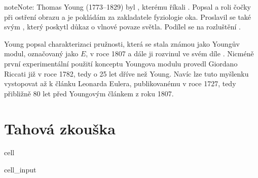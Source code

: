 \documentclass[letterpaper,10pt,english]{jupyterBook}
\begin{document}
\begin{sphinxadmonition}{note}{Note:}
\sphinxAtStartPar
Thomas Young (1773–1829)
 byl , kterému říkali . Popsal  a roli čočky při ostření obrazu a je pokládám za zakladatele fyziologie oka. Proslavil se také svým , který poskytl důkaz o vlnové povaze světla. Podílel se na rozluštění .

\sphinxAtStartPar
Young popsal charakterizaci pružnosti, která se stala známou jako Youngův modul, označovaný jako \(E\), v roce 1807 a dále ji rozvinul ve svém díle . Nicméně první experimentální použití konceptu Youngova modulu provedl Giordano Riccati již v roce 1782, tedy o 25 let dříve než Young. Navíc lze tuto myšlenku vystopovat až k článku Leonarda Eulera, publikovanému v roce 1727, tedy přibližně 80 let před Youngovým článkem z roku 1807.
\end{sphinxadmonition}

\sphinxstepscope


\section{Tahová zkouška}
\label{\detokenize{Prednasky/2_3_Tahov_xe1_zkou_u0161ka:tahova-zkouska}}\label{\detokenize{Prednasky/2_3_Tahov_xe1_zkou_u0161ka::doc}}
\begin{sphinxuseclass}{cell}\begin{sphinxVerbatimInput}

\begin{sphinxuseclass}{cell_input}
\begin{sphinxVerbatim}[commandchars=\\\{\}]
   
   
\end{sphinxVerbatim}

\end{sphinxuseclass}\end{sphinxVerbatimInput}

\end{sphinxuseclass}
\end{document}
